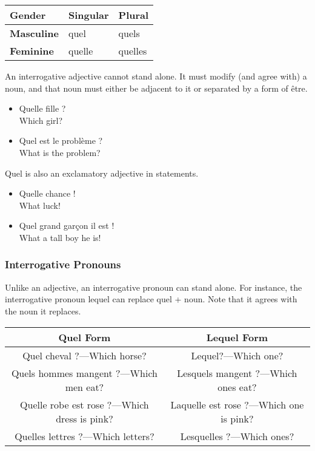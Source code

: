 \begin{center}\begin{tabular}{|l|l|l|}
\hline
\textbf{Gender}    & \textbf{Singular} & \textbf{Plural} \\ \hline
\textbf{Masculine} & quel              & quels           \\ \hline
\textbf{Feminine}  & quelle            & quelles         \\ \hline
\end{tabular}\end{center}

An interrogative adjective cannot stand alone. It must modify (and agree with) a noun, and that noun must either be adjacent to it or separated by a form of {\^e}tre.

\begin{itemize}
  \item  Quelle fille ? \\ Which girl?
  \item  Quel est le probl{\`e}me ? \\ What is the problem?
\end{itemize}

Quel is also an exclamatory adjective in statements.

\begin{itemize}
  \item  Quelle chance ! \\ What luck!
  \item  Quel grand gar{\c c}on il est ! \\ What a tall boy he is!
\end{itemize}

\subsubsection{Interrogative Pronouns}

Unlike an adjective, an interrogative pronoun can stand alone. For instance, the interrogative pronoun lequel can replace quel + noun. Note that it agrees with the noun it replaces.

\begin{center}\begin{tabular}{|c|c|}
\hline
\textbf{Quel Form}                            & \textbf{Lequel Form}                     \\ \hline
Quel cheval ?---Which horse?                  & Lequel?---Which one?                     \\ \hline
Quels hommes mangent ?---Which men eat?       & Lesquels mangent ?---Which ones eat?     \\ \hline
Quelle robe est rose ?---Which dress is pink? & Laquelle est rose ?---Which one is pink? \\ \hline
Quelles lettres ?---Which letters?            & Lesquelles ?---Which ones?               \\ \hline
\end{tabular}\end{center}

